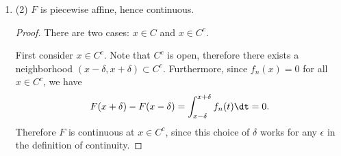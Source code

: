 \begin{enumerate}[label=(4.\arabic*)]
\begin{proof}
    Let $[a, b] \subset C$ be the closed interval containing $x$. Then
    \begin{align*}
      F_{n+1}(x) - F_n(x)
      &= \Big(\int_0^a f_{n+1}(t) \dt + \int_a^x f_{n+1}(t) \dt\Big)
       - \Big(\int_0^a f_{n}(t) \dt   + \int_a^x f_{n}(t) \dt\Big) \\
      &= \Big(\int_0^a f_{n+1}(t) \dt - \int_0^a f_{n}(t) \dt\Big)
       + \Big(\int_a^x f_{n+1}(t) \dt - \int_a^x f_{n}(t) \dt\Big).
    \end{align*}
    Now, for $x \in C^c$, the value of the integral to the left is constant as $n$ increases ().
    I.e. $\int_0^a f_{n+1}(t) \dt - \int_0^a f_{n}(t) \dt = 0$ and we have
    \begin{align*}
      F_{n+1}(x) - F_n(x)
      &=    \int_a^x f_{n+1}(t) \dt - f_{n}(t) \dt \\
      &\leq \int_a^b \big|f_{n+1}(t) \dt - f_{n}(t)\big| \dt.
    \end{align*}



    Since $x \in C^c$ there exists $m$ such that $x \in C_n^c$ for all $n > m$.

    \begin{align*}
      F_0(1) &= \int_0^1 \Big(\frac{3}{2}\Big)^0 \dt \\
      F_1(1) &= \int_0^{1/3} \Big(\frac{3}{2}\Big)^1 \dt + \int_{2/3}^{1} \Big(\frac{3}{2}\Big)^1 \dt \\
    \end{align*}



  \end{proof}

 (1) It seems that this limit will have the form

  (measure on $C$ restricted to $(0, x)$) $\times$ ($(3/2)^n$)

  which is

  $0 \times \infty$.





show $F_n$ is a Cauchy sequence



\item (2) $F$ is piecewise affine, hence continuous.
  \begin{proof}
    There are two cases: $x \in C$ and $x \in C^c$.

    First consider $x \in C^c$. Note that $C^c$ is open, therefore there exists a
    neighborhood $(x - \delta, x + \delta) \subset C^c$. Furthermore, since $f_n(x) = 0$ for all $x \in C^c$,
    we have
    \begin{align*}
      F(x + \delta) - F(x - \delta) = \int_{x-\delta}^{x+\delta}f_n(t) \dt = 0.
    \end{align*}
    Therefore $F$ is continuous at $x \in C^c$, since this choice of $\delta$ works for any $\epsilon$ in the
    definition of continuity.


\end{proof}
\end{enumerate}
